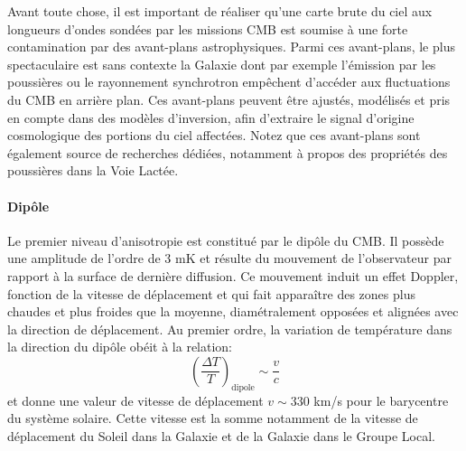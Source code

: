 Avant toute chose, il est important de réaliser qu'une carte brute du ciel aux longueurs d'ondes sondées par les missions CMB est soumise à une forte contamination par des avant-plans astrophysiques. Parmi ces avant-plans, le plus spectaculaire est sans contexte la Galaxie dont par exemple l'émission  par les poussières ou le rayonnement synchrotron empêchent d'accéder aux fluctuations du CMB en arrière plan. Ces avant-plans peuvent être ajustés, modélisés et pris en compte dans des modèles d'inversion, afin d'extraire le signal d'origine cosmologique des portions du ciel affectées. Notez que ces avant-plans sont également source de recherches dédiées, notamment à propos des propriétés des poussières dans la Voie Lactée.

\paragraph{Dipôle} Le premier niveau d'anisotropie est constitué par le dipôle du CMB. Il possède une amplitude de l'ordre de 3 mK et résulte du mouvement de l'observateur par rapport à la surface de dernière diffusion. Ce mouvement induit un effet Doppler, fonction de la vitesse de déplacement et qui fait apparaître des zones plus chaudes et plus froides que la moyenne, diamétralement opposées et alignées avec la direction de déplacement. Au premier ordre, la variation de température dans la direction du dipôle obéit à la relation:
\begin{equation}
\left(\frac{\Delta T}{T}\right)_\mathrm{dipole}\sim \frac{v}{c}
\end{equation}
et donne une valeur de vitesse de déplacement $v\sim 330$ km/s pour le barycentre du système solaire. Cette vitesse est la somme notamment de la vitesse de déplacement du Soleil dans la Galaxie et de la Galaxie dans le Groupe Local.

